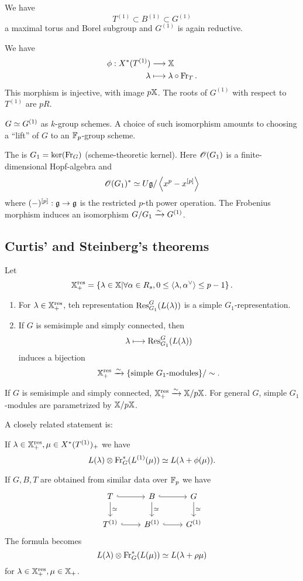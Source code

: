 We have
\[
T^{(1)} \subset B^{(1)}\subset G^{(1)}
\] 
a maximal torus and Borel subgroup and $G^{(1)}$ is again reductive. 

We have
\begin{align*}
	\phi: X^{*}(T^{(1)}) &\longrightarrow \mathbb{X} \\
	\lambda &\longmapsto \lambda\circ\operatorname{Fr}_T.
\end{align*}
This morphism is injective, with image $p\mathbb{X}$. The roots of $G^{(1)}$ with respect to $T^{(1)}$ are $pR$.
\begin{remark}
	$G\simeq G^{(1)}$ as $k$-group schemes. A choice of such isomorphism amounts to choosing a ``lift'' of $G$ to an $\mathbb{F}_p$-group scheme.
\end{remark}
The  is $G_1=\operatorname{ker}(\operatorname{Fr}_G)$ (scheme-theoretic kernel). Here $\mathscr{O}(G_1)$ is a finite-dimensional Hopf-algebra and
\[
	\mathscr{O}(G_1)^{*} \simeq U\mathfrak g / \left<x^{p} - x^{[p]} \right>
\] 
where $(-)^{[p]}:\kg\to \kg$ is the restricted $p$-th power operation. The Frobenius morphism induces an isomorphism $G /G_1\xrightarrow{\sim} G^{(1)}$.

\subsection{Curtis' and Steinberg's theorems}
Let
\[
\mathbb{X}_+^{\mathrm{res}} = \left\{ \lambda\in \mathbb{X} \middle| \forall \alpha \in R_s, 0\le \left<\lambda,\alpha ^{\vee} \right>\le p-1 \right\} .	
\] 
\begin{theorem}[Curtis]\leavevmode
	\begin{enumerate}[(1)]
		\item For $\lambda\in \mathbb{X}_+^{\mathrm{res}}$, teh representation $\operatorname{Res}_{G_1}^{G}(L(\lambda))$ is a simple $G_1$-representation.
		\item If $G$ is semisimple and simply connected, then
			 \[
			\lambda\mapsto \Res_{G_1}^{G}(L(\lambda))
			\] 
			induces a bijection
			\[
			\mathbb{X}_+^{\mathrm{res}}\xrightarrow{\sim} \{\text{simple }G_1\text{-modules}\} /\sim.
			\] 
	\end{enumerate}
\end{theorem}
\begin{remark}
	If $G$ is semisimple and simply connected, $\mathbb{X}_+^{\mathrm{res}}\xrightarrow{\sim} \mathbb{X} /p\mathbb{X}$. For general $G$, simple $G_1$-modules are parametrized by $\mathbb{X} /p\mathbb{X}$.
\end{remark}
A closely related statement is:
\begin{theorem}[Steinberg]
	If $\lambda\in \mathbb{X}_+^{\mathrm{res}}, \mu\in X^{*}(T^{(1)})_+$ we have
	\[
	L(\lambda)\otimes \operatorname{Fr}_G^{*}(L^{(1)}(\mu)) \simeq L(\lambda+\phi(\mu)).
	\] 	
\end{theorem}
If $G,B,T$ are obtained from similar data over $\mathbb{F}_p$ we have 
\[
\begin{tikzcd}
	T \ar[r,hook] \ar[d,"\isoto"] & B \ar[r,hook] \ar[d,"\isoto"] & G \ar[d,"\isoto"] \\
	T^{(1)} \ar[r,hook] & B^{(1)} \ar[r,hook] & G^{(1)}
\end{tikzcd}
\]
The formula becomes
\[
L(\lambda) \otimes \operatorname{Fr}_G^{*}(L(\mu)) \simeq L(\lambda+\rho\mu)
\] 
for $\lambda\in \mathbb{X}_+^{\mathrm{res}}, \mu\in\mathbb{X}_{+}$.

